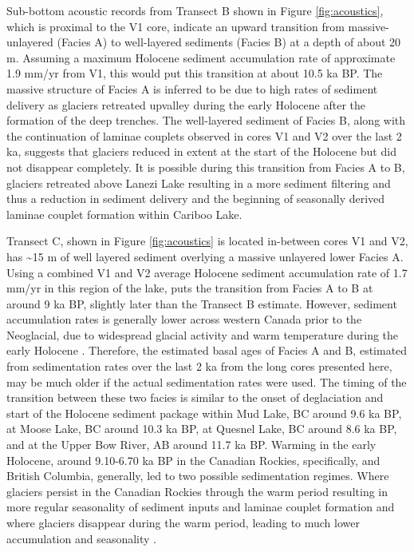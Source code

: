 \documentclass[Royal,times,doublespace,sageh]{sagej}
\begin{document}
Sub-bottom acoustic records from Transect B shown in Figure
\ref{fig:acoustics}, which is proximal to the V1 core, indicate an
upward transition from massive-unlayered (Facies A) to well-layered
sediments (Facies B) at a depth of about 20 m. Assuming a maximum
Holocene sediment accumulation rate of approximate 1.9 mm/yr from V1,
this would put this transition at about 10.5 ka BP. The massive
structure of Facies A is inferred to be due to high rates of sediment
delivery as glaciers retreated upvalley during the early Holocene after
the formation of the deep trenches. The well-layered sediment of Facies
B, along with the continuation of laminae couplets observed in cores V1
and V2 over the last 2 ka, suggests that glaciers reduced in extent at
the start of the Holocene but did not disappear completely. It is
possible during this transition from Facies A to B, glaciers retreated
above Lanezi Lake resulting in a more sediment filtering and thus a
reduction in sediment delivery and the beginning of seasonally derived
laminae couplet formation within Cariboo Lake.

Transect C, shown in Figure \ref{fig:acoustics} is located in-between
cores V1 and V2, has \textasciitilde15 m of well layered sediment
overlying a massive unlayered lower Facies A. Using a combined V1 and V2
average Holocene sediment accumulation rate of 1.7 mm/yr in this region
of the lake, puts the transition from Facies A to B at around 9 ka BP,
slightly later than the Transect B estimate. However, sediment
accumulation rates is generally lower across western Canada prior to the
Neoglacial, due to widespread glacial activity and warm temperature
during the early Holocene
\citep{Steinman2019, Menounos2004, Koch2007a, Osborn2007, Luckman1988, Luckman1993}.
Therefore, the estimated basal ages of Facies A and B, estimated from
sedimentation rates over the last 2 ka from the long cores presented
here, may be much older if the actual sedimentation rates were used. The
timing of the transition between these two facies is similar to the
onset of deglaciation and start of the Holocene sediment package within
Mud Lake, BC \citep{Hodder2006b} around 9.6 ka BP, at Moose Lake, BC
\citep{Desloges1999} around 10.3 ka BP, at Quesnel Lake, BC
\citep{Gilbert2012} around 8.6 ka BP, and at the Upper Bow River, AB
\citep{Leonard1999} around 11.7 ka BP. Warming in the early Holocene,
around 9.10-6.70 ka BP in the Canadian Rockies, specifically,
\citep{Luckman1986} and British Columbia, generally,
\citep{Clague1989, Steinman2019} led to two possible sedimentation
regimes. Where glaciers persist in the Canadian Rockies through the warm
period resulting in more regular seasonality of sediment inputs and
laminae couplet formation \citep[e.g.~Mud Lake,][]{Hodder2006b} and
where glaciers disappear during the warm period, leading to much lower
accumulation and seasonality \citep[e.g.~Moose Lake,][]{Desloges1999}.
\end{document}
